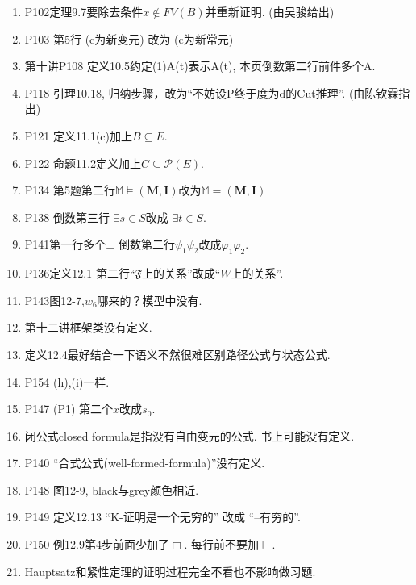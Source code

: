\documentclass{article}
\begin{document}
\begin{enumerate}
\item P102定理9.7要除去条件$x\notin FV(B)$并重新证明. (由吴骏给出)
\item P103 第5行 (c为新变元) 改为 (c为新常元)
\item 第十讲P108 定义10.5约定(1)A(t)表示A(t), 本页倒数第二行前件多个A. 
\item P118 引理10.18, 归纳步骤，改为``不妨设P终于度为d的Cut推理''. (由陈钦霖指出)
\item P121 定义11.1(c)加上$B\subseteq E$. 
\item P122 命题11.2定义加上$C\subseteq \mathcal{P}(E)$. 
\item P134 第5题第二行$\mathbb{M}\models(\mathbf{M}, \mathbf{I})$改为$\mathbb{M}=(\mathbf{M}, \mathbf{I})$
\item P138 倒数第三行 $\exists s \in S$改成 $\exists t \in S$. 
\item P141第一行多个$\bot$ 倒数第二行$\psi_1 \psi_2$改成$\varphi_1 \varphi_2$. 
\item P136定义12.1 第二行``$\mathfrak{F}$上的关系''改成``$W$上的关系''. 
\item P143图12-7,$w_6$哪来的？模型中没有. 
\item 第十二讲框架类没有定义. 


\item 定义12.4最好结合一下语义不然很难区别路径公式与状态公式. 
\item P154 (h),(i)一样. 
\item P147 (P1) 第二个$x$改成$s_0$. 
\item 闭公式closed formula是指没有自由变元的公式. 书上可能没有定义. 
\item P140 ``合式公式(well-formed-formula)''没有定义. 
\item P148 图12-9, black与grey颜色相近. 
\item P149 定义12.13 ``K-证明是一个无穷的'' 改成 ``--有穷的''. 
\item P150 例12.9第4步前面少加了$\Box$. 每行前不要加$\vdash$. 

\item Hauptsatz和紧性定理的证明过程完全不看也不影响做习题. 








\end{enumerate}
\end{document}
